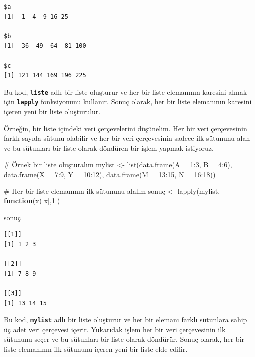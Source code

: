 \documentclass[
  letterpaper,
  DIV=11,
  numbers=noendperiod]{scrreprt}
\newenvironment{Shaded}{\begin{snugshade}}{\end{snugshade}}
\newcommand{\AttributeTok}[1]{\textcolor[rgb]{0.40,0.45,0.13}{#1}}
\newcommand{\CommentTok}[1]{\textcolor[rgb]{0.37,0.37,0.37}{#1}}
\newcommand{\ControlFlowTok}[1]{\textcolor[rgb]{0.00,0.23,0.31}{\textbf{#1}}}
\newcommand{\DecValTok}[1]{\textcolor[rgb]{0.68,0.00,0.00}{#1}}
\newcommand{\FunctionTok}[1]{\textcolor[rgb]{0.28,0.35,0.67}{#1}}
\newcommand{\NormalTok}[1]{\textcolor[rgb]{0.00,0.23,0.31}{#1}}
\newcommand{\OtherTok}[1]{\textcolor[rgb]{0.00,0.23,0.31}{#1}}
\newcommand{\SpecialCharTok}[1]{\textcolor[rgb]{0.37,0.37,0.37}{#1}}
\begin{document}
\begin{verbatim}
$a
[1]  1  4  9 16 25

$b
[1]  36  49  64  81 100

$c
[1] 121 144 169 196 225
\end{verbatim}

Bu kod, \textbf{\texttt{liste}} adlı bir liste oluşturur ve her bir
liste elemanının karesini almak için \textbf{\texttt{lapply}}
fonksiyonunu kullanır. Sonuç olarak, her bir liste elemanının karesini
içeren yeni bir liste oluşturulur.

Örneğin, bir liste içindeki veri çerçevelerini düşünelim. Her bir veri
çerçevesinin farklı sayıda sütunu olabilir ve her bir veri çerçevesinin
sadece ilk sütununu alan ve bu sütunları bir liste olarak döndüren bir
işlem yapmak istiyoruz.

\begin{Shaded}
\begin{Highlighting}[]
\CommentTok{\# Örnek bir liste oluşturalım}
\NormalTok{mylist }\OtherTok{\textless{}{-}} \FunctionTok{list}\NormalTok{(}\FunctionTok{data.frame}\NormalTok{(}\AttributeTok{A =} \DecValTok{1}\SpecialCharTok{:}\DecValTok{3}\NormalTok{, }\AttributeTok{B =} \DecValTok{4}\SpecialCharTok{:}\DecValTok{6}\NormalTok{),}
               \FunctionTok{data.frame}\NormalTok{(}\AttributeTok{X =} \DecValTok{7}\SpecialCharTok{:}\DecValTok{9}\NormalTok{, }\AttributeTok{Y =} \DecValTok{10}\SpecialCharTok{:}\DecValTok{12}\NormalTok{),}
               \FunctionTok{data.frame}\NormalTok{(}\AttributeTok{M =} \DecValTok{13}\SpecialCharTok{:}\DecValTok{15}\NormalTok{, }\AttributeTok{N =} \DecValTok{16}\SpecialCharTok{:}\DecValTok{18}\NormalTok{))}

\CommentTok{\# Her bir liste elemanının ilk sütununu alalım}
\NormalTok{sonuç }\OtherTok{\textless{}{-}} \FunctionTok{lapply}\NormalTok{(mylist, }\ControlFlowTok{function}\NormalTok{(x) x[,}\DecValTok{1}\NormalTok{])}

\NormalTok{sonuç}
\end{Highlighting}
\end{Shaded}

\begin{verbatim}
[[1]]
[1] 1 2 3

[[2]]
[1] 7 8 9

[[3]]
[1] 13 14 15
\end{verbatim}

Bu kod, \textbf{\texttt{mylist}} adlı bir liste oluşturur ve her bir
elemanı farklı sütunlara sahip üç adet veri çerçevesi içerir. Yukarıdak
işlem her bir veri çerçevesinin ilk sütununu seçer ve bu sütunları bir
liste olarak döndürür. Sonuç olarak, her bir liste elemanının ilk
sütununu içeren yeni bir liste elde edilir.
\end{document}

